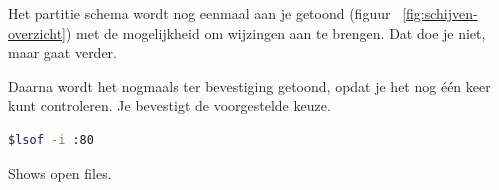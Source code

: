 \documentclass[12pt,a4paper]{article}
\begin{document}
Het partitie schema wordt nog eenmaal aan je getoond (figuur ~\ref{fig:schijven-overzicht}) met de mogelijkheid om wijzingen aan te brengen. Dat doe je niet, maar gaat verder.

Daarna wordt het nogmaals ter bevestiging getoond, opdat je het nog \'{e}\'{e}n keer kunt controleren. Je bevestigt de voorgestelde keuze.

\begin{lstlisting}[language=bash]
$lsof -i :80
\end{lstlisting}
Shows open files.
\end{document}
